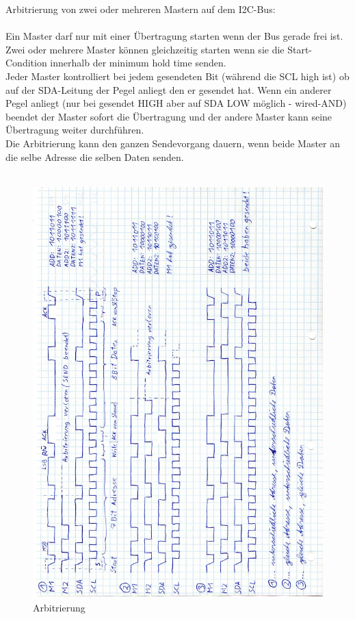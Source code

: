 \documentclass[12pt,a4paper,ngerman]{article}
\begin{document}
Arbitrierung von zwei oder mehreren Mastern auf dem I2C-Bus:\\
\\
Ein Master darf nur mit einer Übertragung starten wenn der Bus gerade frei ist.\\
Zwei oder mehrere Master können gleichzeitig starten wenn sie die Start-Condition innerhalb der minimum hold time senden.\\
Jeder Master kontrolliert bei jedem gesendeten Bit (während die SCL high ist) ob auf der SDA-Leitung der Pegel anliegt den er gesendet hat. Wenn ein anderer Pegel anliegt (nur bei gesendet HIGH aber auf SDA LOW möglich - wired-AND) beendet der Master sofort die Übertragung und der andere Master kann seine Übertragung weiter durchführen.\\
Die Arbitrierung kann den ganzen Sendevorgang dauern, wenn beide Master an die selbe Adresse die selben Daten senden.\\
\\
\begin{figure}[h!]
\begin{center}
\includegraphics[scale=0.72]{figures/Aufgabe_3_2_arbitrierung.jpg} 
\caption{Arbitrierung}
\end{center}
\vspace{-20pt}
\end{figure}\\
\end{document}

